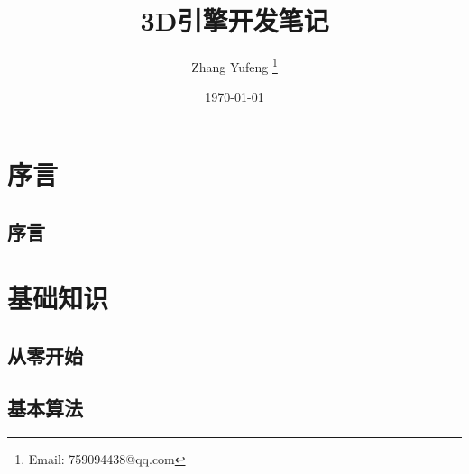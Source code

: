 \documentclass[
    UTF8,       %
    b5paper,    %
    10pt,       %
    oneside,    %
    openright,  %
    titlepage,  %
    final       %
]{ctexbook}
\title{3D引擎开发笔记}
\author{Zhang Yufeng \thanks{Email: 759094438@qq.com}}
\date{\today}
\begin{document}
    \maketitle
    \tableofcontents

    \frontmatter

    \maketitle
    \part{序言}

    \maketitle
    \chapter{序言}
    

    \mainmatter

    \maketitle
    \part{基础知识}

    \maketitle
    \chapter{从零开始}
    
    
    
    
    

    \maketitle
    \chapter{基本算法}
    
\end{document}
